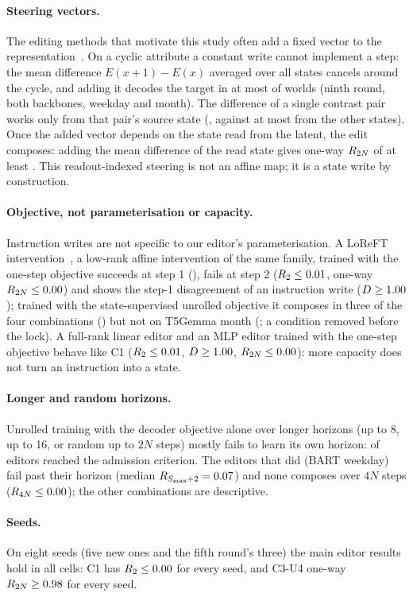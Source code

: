 \paragraph{Steering vectors.}
The editing methods that motivate this study often add a fixed vector to the representation~\citep{turner2023actadd,zou2023repe}. On a cyclic
attribute a constant write cannot implement a step: the mean difference $E(x+1)-E(x)$ averaged over all states cancels around the cycle,
and adding it decodes the target in at most \CLtwentyBoneaMax{} of worlds (ninth round, both backbones, weekday and month). The
difference of a single contrast pair works only from that pair's source state (\CLtwentyBonebXzero{}, against at most
\CLtwentyBonebOther{} from the other states). Once the added vector depends on the state read from the latent, the edit composes:
adding the mean difference of the read state gives one-way $R_{2N}$ of at least \CLtwentyBonecMin{}. This readout-indexed steering is
not an affine map; it is a state write by construction.

\paragraph{Objective, not parameterisation or capacity.}
Instruction writes are not specific to our editor's parameterisation. A LoReFT intervention~\citep{wu2024reft}, a low-rank affine
intervention of the same family, trained with the one-step objective succeeds at step 1 (\CLtwentyoneLConeRone{}), fails at step 2
($R_{2} \le 0.01{}$, one-way $R_{2N} \le 0.00{}$) and shows the step-1 disagreement of an instruction
write ($D \ge 1.00{}$); trained with the state-supervised unrolled objective it composes in three of the four combinations
(\CLtwentyoneLCthreeMin{}) but not on T5Gemma month (\CLtwentyoneLCthreeTfive{}; a condition removed before the lock). A full-rank linear
editor and an MLP editor trained with the one-step objective behave like C1 ($R_{2} \le 0.01{}$, $D \ge
1.00{}$, $R_{2N} \le 0.00{}$): more capacity does not turn an instruction into a state.

\paragraph{Longer and random horizons.}
Unrolled training with the decoder objective alone over longer horizons (up to 8, up to 16, or random up to $2N$ steps) mostly fails to
learn its own horizon: \CLtwentytwoAdmitted{} of \CLtwentytwoTrained{} editors reached the admission criterion. The editors that did
(BART weekday) fail past their horizon (median $R_{S_{\max}+2} = 0.07{}$) and none composes over $4N$ steps
($R_{4N} \le 0.00{}$); the other combinations are descriptive.

\paragraph{Seeds.}
On eight seeds (five new ones and the fifth round's three) the main editor results hold in all \CLtwentyfourCells{} cells: C1 has
$R_{2} \le 0.00{}$ for every seed, and C3-U4 one-way $R_{2N} \ge 0.98{}$ for every seed.
